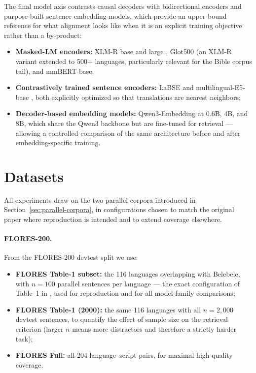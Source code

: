 The final model axis contrasts causal decoders with bidirectional
encoders and purpose-built sentence-embedding models, which provide an
upper-bound reference for what alignment looks like when it is an explicit
training objective rather than a by-product:

\begin{itemize}
    \item \textbf{Masked-LM encoders:} XLM-R base and large
    \citep{conneau2020xlmr}, Glot500 \citep{imani2023glot500} (an XLM-R
    variant extended to 500+ languages, particularly relevant for the
    Bible corpus tail), and mmBERT-base;
    \item \textbf{Contrastively trained sentence encoders:} LaBSE
    \citep{feng2022labse} and multilingual-E5-base
    \citep{wang2024multilingual}, both explicitly optimized so that
    translations are nearest neighbors;
    \item \textbf{Decoder-based embedding models:} Qwen3-Embedding at
    0.6B, 4B, and 8B, which share the Qwen3 backbone but are fine-tuned
    for retrieval --- allowing a controlled comparison of the same
    architecture before and after embedding-specific training.
\end{itemize}

\section{Datasets}
\label{sec:datasets}

All experiments draw on the two parallel corpora introduced in
Section~\ref{sec:parallel-corpora}, in configurations chosen to match the
original paper where reproduction is intended and to extend coverage
elsewhere.

\paragraph{FLORES-200.}
From the FLORES-200 devtest split \citep{nllbteam2022} we use:
\begin{itemize}
    \item \textbf{FLORES Table-1 subset:} the 116 languages overlapping
    with Belebele, with $n = 100$ parallel sentences per language ---
    the exact configuration of Table~1 in \citet{kargaran2025mexa}, used
    for reproduction and for all model-family comparisons;
    \item \textbf{FLORES Table-1 (2000):} the same 116 languages with all
    $n = 2{,}000$ devtest sentences, to quantify the effect of sample
    size on the retrieval criterion (larger $n$ means more distractors
    and therefore a strictly harder task);
    \item \textbf{FLORES Full:} all 204 language--script pairs, for
    maximal high-quality coverage.
\end{itemize}

